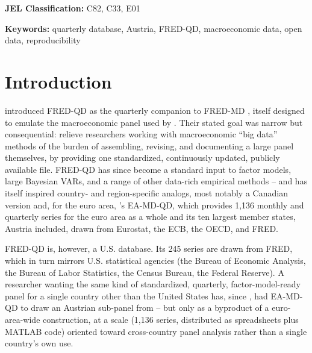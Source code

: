 \documentclass[11pt]{article}
\begin{document}
\noindent\textbf{JEL Classification:} C82, C33, E01

\noindent\textbf{Keywords:} quarterly database, Austria, FRED-QD, macroeconomic data, open data, reproducibility

\section{Introduction}

\citet{mccracken2020fred} introduced FRED-QD as the quarterly companion to
FRED-MD \citep{mccracken2016fred}, itself designed to emulate the
macroeconomic panel used by \citet{stockwatson2012disentangling}. Their
stated goal was narrow but consequential: relieve researchers working with
macroeconomic ``big data'' methods of the burden of assembling, revising,
and documenting a large panel themselves, by providing one standardized,
continuously updated, publicly available file. FRED-QD has since become a
standard input to factor models, large Bayesian VARs, and a range of other
data-rich empirical methods -- and has itself inspired country- and
region-specific analogs, most notably a Canadian version
\citep{fortingagnon2018fred} and, for the euro area,
\citet{barigozzi2024eamdqd}'s EA-MD-QD, which provides 1,136 monthly and
quarterly series for the euro area as a whole and its ten largest member
states, Austria included, drawn from Eurostat, the ECB, the OECD, and FRED.

FRED-QD is, however, a U.S. database. Its 245 series are drawn from FRED,
which in turn mirrors U.S. statistical agencies (the Bureau of Economic
Analysis, the Bureau of Labor Statistics, the Census Bureau, the Federal
Reserve). A researcher wanting the same kind of standardized, quarterly,
factor-model-ready panel for a single country other than the United
States has, since \citeyear{barigozzi2024eamdqd}, had EA-MD-QD to draw an
Austrian sub-panel from -- but only as a byproduct of a euro-area-wide
construction, at a scale (1,136 series, distributed as spreadsheets plus
MATLAB code) oriented toward cross-country panel analysis rather than a
single country's own use.
\end{document}
